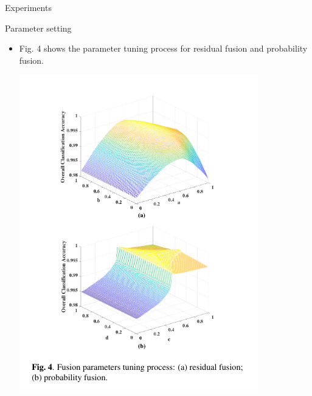 \documentclass{beamer}
\begin{document}
\begin{frame}{Experiments}
    \begin{block}{Parameter setting}
     \begin{itemize}
         \item Fig.   4 shows  the parameter tuning  process for  residual fusion and probability fusion. 
         \begin{center}
            \includegraphics[scale =0.4]{fig4}
         \end{center}
     \end{itemize}
    \end{block}
\end{frame}
\end{document}
